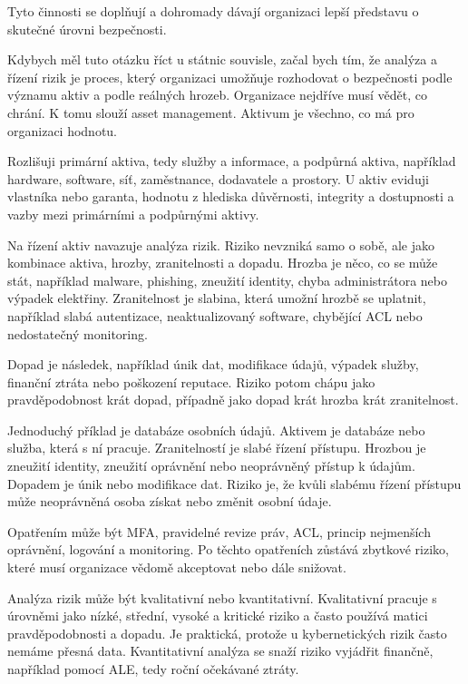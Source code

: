 \documentclass[11pt,a4paper]{article}
\begin{document}
Tyto činnosti se doplňují a dohromady dávají organizaci lepší představu o skutečné úrovni bezpečnosti.

Kdybych měl tuto otázku říct u státnic souvisle, začal bych tím, že analýza a řízení rizik je proces, který organizaci umožňuje rozhodovat o bezpečnosti podle významu aktiv a podle reálných hrozeb. Organizace nejdříve musí vědět, co chrání. K tomu slouží asset management. Aktivum je všechno, co má pro organizaci hodnotu.

Rozlišuji primární aktiva, tedy služby a informace, a podpůrná aktiva, například hardware, software, síť, zaměstnance, dodavatele a prostory. U aktiv eviduji vlastníka nebo garanta, hodnotu z hlediska důvěrnosti, integrity a dostupnosti a vazby mezi primárními a podpůrnými aktivy.

Na řízení aktiv navazuje analýza rizik. Riziko nevzniká samo o sobě, ale jako kombinace aktiva, hrozby, zranitelnosti a dopadu. Hrozba je něco, co se může stát, například malware, phishing, zneužití identity, chyba administrátora nebo výpadek elektřiny. Zranitelnost je slabina, která umožní hrozbě se uplatnit, například slabá autentizace, neaktualizovaný software, chybějící ACL nebo nedostatečný monitoring.

Dopad je následek, například únik dat, modifikace údajů, výpadek služby, finanční ztráta nebo poškození reputace. Riziko potom chápu jako pravděpodobnost krát dopad, případně jako dopad krát hrozba krát zranitelnost.

Jednoduchý příklad je databáze osobních údajů. Aktivem je databáze nebo služba, která s ní pracuje. Zranitelností je slabé řízení přístupu. Hrozbou je zneužití identity, zneužití oprávnění nebo neoprávněný přístup k údajům. Dopadem je únik nebo modifikace dat. Riziko je, že kvůli slabému řízení přístupu může neoprávněná osoba získat nebo změnit osobní údaje.

Opatřením může být MFA, pravidelné revize práv, ACL, princip nejmenších oprávnění, logování a monitoring. Po těchto opatřeních zůstává zbytkové riziko, které musí organizace vědomě akceptovat nebo dále snižovat.

Analýza rizik může být kvalitativní nebo kvantitativní. Kvalitativní pracuje s úrovněmi jako nízké, střední, vysoké a kritické riziko a často používá matici pravděpodobnosti a dopadu. Je praktická, protože u kybernetických rizik často nemáme přesná data. Kvantitativní analýza se snaží riziko vyjádřit finančně, například pomocí ALE, tedy roční očekávané ztráty.
\end{document}
